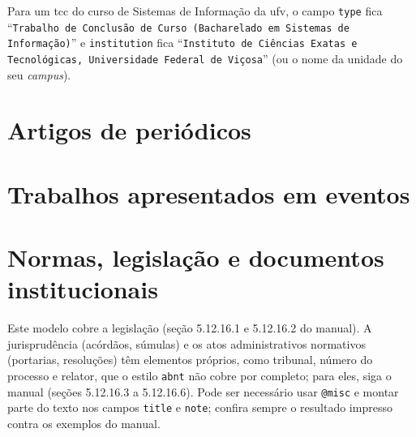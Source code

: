 
\begingroup\sloppy
Para um \ac{tcc} do curso de Sistemas de Informação da \ac{ufv}, o campo \texttt{type} fica
``\texttt{Trabalho de Conclusão de Curso (Bacharelado em Sistemas de Informação)}'' e
\texttt{institution} fica
``\texttt{Instituto de Ciências Exatas e Tecnológicas, Universidade Federal de Viçosa}'' (ou o nome da unidade do seu \emph{campus}).\par\endgroup

\section{Artigos de periódicos}


\section{Trabalhos apresentados em eventos}


\section{Normas, legislação e documentos institucionais}


Este modelo cobre a legislação (seção 5.12.16.1 e 5.12.16.2 do manual). A jurisprudência
(acórdãos, súmulas) e os atos administrativos normativos (portarias, resoluções) têm
elementos próprios, como tribunal, número do processo e relator, que o estilo \texttt{abnt}
não cobre por completo; para eles, siga o manual (seções 5.12.16.3 a 5.12.16.6). Pode ser necessário usar
\texttt{@misc} e montar parte do texto nos campos \texttt{title} e \texttt{note}; confira
sempre o resultado impresso contra os exemplos do manual.

